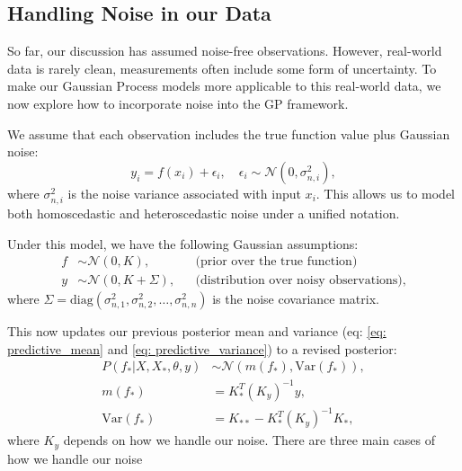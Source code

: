 \documentclass[10pt]{article}
\begin{document}
\subsection{Handling Noise in our Data}
\label{sec: Handlingnoise}

So far, our discussion has assumed noise-free observations. However, real-world data is rarely clean, measurements often include some form of uncertainty. To make our Gaussian Process models more applicable to this real-world data,
we now explore how to incorporate noise into the GP framework.

\bigskip

\noindent
We assume that each observation includes the true function value plus Gaussian noise:
\begin{equation}
y_i = f(x_i) + \epsilon_i, \quad \epsilon_i \sim \mathcal{N}(0, \sigma_{n,i}^2),
\end{equation}
where \( \sigma_{n,i}^2 \) is the noise variance associated with input \( x_i \). This allows us to model both homoscedastic and heteroscedastic noise under a unified notation.

\bigskip

\noindent
Under this model, we have the following Gaussian assumptions:
\begin{align}
f &\sim \mathcal{N}(0, K), &&\text{(prior over the true function)} \\
y &\sim \mathcal{N}(0, K + \Sigma), &&\text{(distribution over noisy observations)},
\label{eq: prior_distribution_noise}
\end{align}
where \( \Sigma = \mathrm{diag}(\sigma_{n,1}^2, \sigma_{n,2}^2, \dots, \sigma_{n,n}^2) \) is the noise covariance matrix.

\bigskip
\noindent
This now updates our previous posterior mean and variance (eq: \ref{eq: predictive_mean} and \ref{eq: predictive_variance}) to a revised posterior:
%
%
\begin{subequations}
\begin{align}
    P(f_*|X,X_*,\theta,y) &\sim \mathcal{N}(m(f_*), \text{Var}(f_*))
    \label{eq: predictive_distribution_noise},\\
m(f_*) &= K_*^T (K_y)^{-1} y,
\label{eq: predictive_mean_noise}\\
\text{Var}(f_*) &= K_{**} - K_*^T (K_y)^{-1} K_*,
\label{eq: predictive_variance_noise}
\end{align}
\end{subequations}
%
%
where \(K_y\) depends on how we handle our noise. There are three main cases of how we handle our noise
\end{document}
